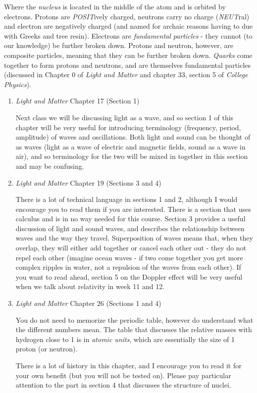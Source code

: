 \documentclass[addpoints,12pt]{exam}
\begin{document}
Where the \textit{nucleus} is located in the middle of the atom and is orbited by electrons. Protons are \textit{POSIT}ively charged, neutrons carry no charge (\textit{NEUT}ral) and electron are negatively charged (and named for archaic reasons having to due with Greeks and tree resin). Electrons are \textit{fundamental particles} - they cannot (to our knowledge) be further broken down. Protons and neutron, however, are composite particles, meaning that they can be further broken down. \textit{Quarks} come together to form protons and neutrons, and are themselves fundamental particles (discussed in Chapter 0 of \textit{Light and Matter} and chapter 33, section 5 of \textit{College Physics}).

\begin{enumerate}


	\item \textit{Light and Matter} Chapter 17 (Section 1)
	
	Next class we will be discussing light as a wave, and so section 1 of this chapter will be very useful for introducing terminology (frequency, period, amplitude) of waves and oscillations. Both light and sound can be thought of as waves (light as a wave of electric and magnetic fields, sound as a wave in air), and so terminology for the two will be mixed in together in this section and may be confusing.	
	
	\item \textit{Light and Matter} Chapter 19 (Sections 3 and 4)
	
	There is a lot of technical language in sections 1 and 2, although I would encourage you to read them if you are interested. There is a section that uses calculus and is in no way needed for this course. Section 3 provides a useful discussion of light and sound waves, and describes the relationship between waves and the way they travel. Superposition of waves means that, when they overlap, they will either add together or cancel each other out - they do not repel each other (imagine ocean waves - if two come together you get more complex ripples in water, not a repulsion of the waves from each other). If you want to read ahead, section 5 on the Doppler effect will be very useful when we talk about relativity in week 11 and 12.
	
	\item \textit{Light and Matter} Chapter 26 (Sections 1 and 4)
	
	You do not need to memorize the periodic table, however do understand what the different numbers mean. The table that discusses the relative masses with hydrogen close to 1 is in \textit{atomic units}, which are essentially the size of 1 proton (or neutron).
	
	There is a lot of history in this chapter, and I encourage you to read it for your own benefit (but you will not be tested on). Please pay particular attention to the part in section 4 that discusses the structure of nuclei.
	
	
	
	
\end{enumerate}
\end{document}
